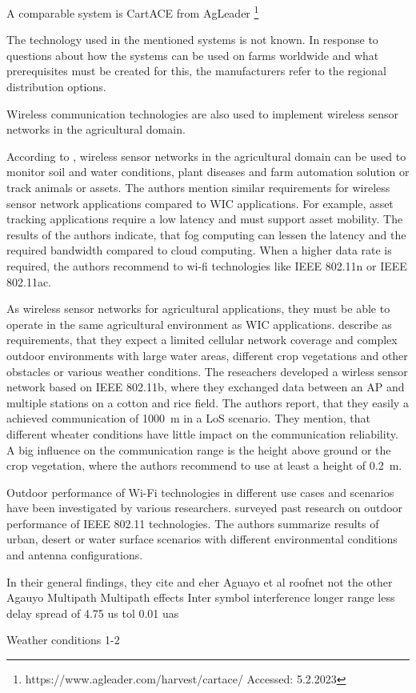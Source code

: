 A comparable system is CartACE from AgLeader \footnote{https://www.agleader.com/harvest/cartace/ Accessed: 5.2.2023}

The technology used in the mentioned systems is not known. In response to questions about how the systems can be used on farms worldwide and what prerequisites must be created for this, the manufacturers refer to the regional distribution options.



Wireless communication technologies are also used to implement wireless sensor networks in the agricultural domain.

According to \textcite{ahmed_internet_2018}, wireless sensor networks in the agricultural domain can be used to monitor soil and water conditions, plant diseases and farm automation solution
or track animals or assets. The authors mention similar requirements for wireless sensor network applications compared to \ac{WIC} applications.
For example, asset tracking applications require a low latency and must support asset mobility.
The results of the authors indicate, that fog computing can lessen the latency and the required bandwidth compared to cloud computing.
When a higher data rate is required, the authors recommend to wi-fi technologies like IEEE 802.11n or IEEE 802.11ac.

As wireless sensor networks for agricultural applications, they must be able to operate in the same agricultural environment as \ac{WIC} applications.
\textcite{brinkhoff_characterization_2017} describe as requirements, that they expect a limited cellular network coverage and complex outdoor
environments with large water areas, different crop vegetations and other obstacles or various weather conditions. The
reseachers developed a wirless sensor network based on IEEE 802.11b, where they exchanged data between an \ac{AP} and multiple stations on
a cotton and rice field. The authors report, that they easily a achieved communication of \SI{1000}{\metre} in a \ac{LoS} scenario.
They mention, that different wheater conditions have little impact on the communication reliability. A big influence on the communication range is
the height above ground or the crop vegetation, where the authors recommend to use at least a height of \SI{0.2}{\metre}.

Outdoor performance of Wi-Fi technologies in different use cases and scenarios have been investigated by various researchers.
\textcite{aust_outdoor_2015} surveyed past research on outdoor performance of IEEE 802.11 technologies. The authors summarize results of
urban, desert or water surface scenarios with different environmental conditions and antenna configurations.


In their general findings, they cite \cite{Sheth} and eher Aguayo et al roofnet not the other
Agauyo Multipath
\cite{Sheth} Multipath effects Inter symbol interference
longer range less delay spread of 4.75 us tol 0.01 uas


Weather conditions 1-2 \cite{Chebrolu} \cite{brinkhoff_characterization_2017}
